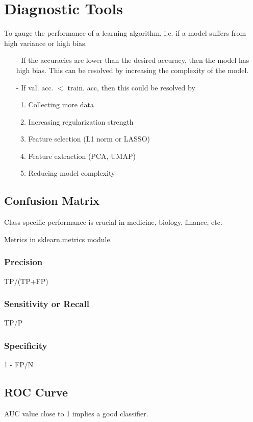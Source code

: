 \documentclass[a4paper, 12pt]{report}
\begin{document}
\chapter{Diagnostic Tools}
To gauge the performance of a learning algorithm, i.e. if a model suffers from high variance or high bias.
\begin{itemize}


\item[-] If the accuracies are lower than the desired accuracy, then the model has high bias. This can be resolved by increasing the complexity of the model.

\item[-] If val. acc. $<$ train. acc, then this could be resolved by
\begin{enumerate}
\item Collecting more data
\item Increasing regularization strength
\item Feature selection (L1 norm or LASSO)
\item Feature extraction (PCA, UMAP)
\item Reducing model complexity
\end{enumerate}

\end{itemize}

\section{Confusion Matrix}
Class specific performance is crucial in medicine, biology, finance, etc.

Metrics in sklearn.metrics module.

\subsection{Precision}
TP/(TP+FP)

\subsection{Sensitivity or Recall}
TP/P

\subsection{Specificity}
1 - FP/N

\section{ROC Curve}
AUC value close to 1 implies a good classifier.
\end{document}
